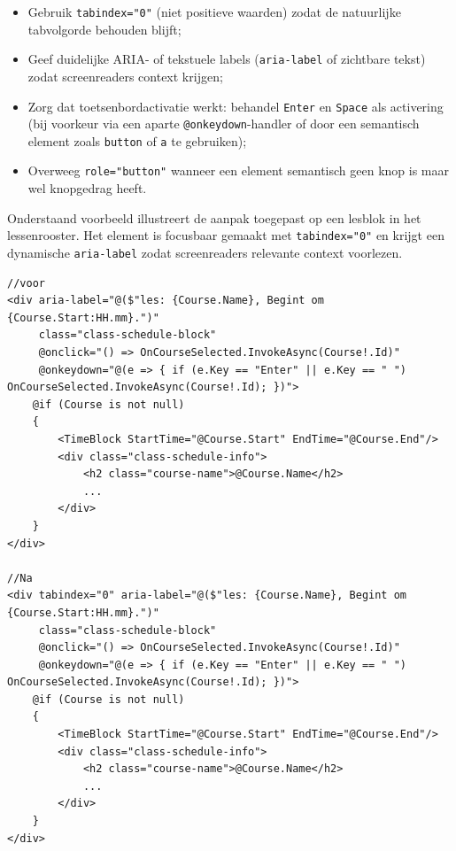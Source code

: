 \begin{itemize}
    \item Gebruik \texttt{tabindex="0"} (niet positieve waarden) zodat de natuurlijke tabvolgorde behouden blijft;
    \item Geef duidelijke ARIA- of tekstuele labels (\texttt{aria-label} of zichtbare tekst) zodat screenreaders context krijgen;
    \item Zorg dat toetsenbordactivatie werkt: behandel \texttt{Enter} en \texttt{Space} als activering (bij voorkeur via een aparte \texttt{@onkeydown}-handler of door een semantisch element zoals \texttt{button} of \texttt{a} te gebruiken);
    \item Overweeg \texttt{role="button"} wanneer een element semantisch geen knop is maar wel knopgedrag heeft.
\end{itemize}
Onderstaand voorbeeld illustreert de aanpak toegepast op een lesblok in het lessenrooster. Het element is focusbaar gemaakt met \texttt{tabindex="0"} en krijgt een dynamische \texttt{aria-label} zodat screenreaders relevante context voorlezen.

\begin{listing}[H]
\begin{verbatim}
//voor
<div aria-label="@($"les: {Course.Name}, Begint om {Course.Start:HH.mm}.")" 
     class="class-schedule-block"
     @onclick="() => OnCourseSelected.InvokeAsync(Course!.Id)"
     @onkeydown="@(e => { if (e.Key == "Enter" || e.Key == " ") OnCourseSelected.InvokeAsync(Course!.Id); })">
    @if (Course is not null)
    {
        <TimeBlock StartTime="@Course.Start" EndTime="@Course.End"/>
        <div class="class-schedule-info">
            <h2 class="course-name">@Course.Name</h2>
            ...
        </div>
    }
</div>

//Na
<div tabindex="0" aria-label="@($"les: {Course.Name}, Begint om {Course.Start:HH.mm}.")" 
     class="class-schedule-block"
     @onclick="() => OnCourseSelected.InvokeAsync(Course!.Id)"
     @onkeydown="@(e => { if (e.Key == "Enter" || e.Key == " ") OnCourseSelected.InvokeAsync(Course!.Id); })">
    @if (Course is not null)
    {
        <TimeBlock StartTime="@Course.Start" EndTime="@Course.End"/>
        <div class="class-schedule-info">
            <h2 class="course-name">@Course.Name</h2>
            ...
        </div>
    }
</div>
\end{verbatim}
\caption{Gebruik van \texttt{tabindex="0"} en keyboard-activatie op een lesblok.}
\label{lst:tabindex-course}
\end{listing}

